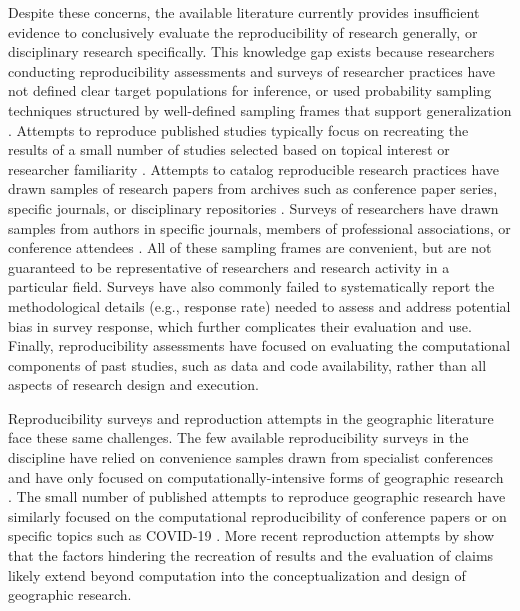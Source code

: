 \documentclass[]{interact}
\newcommand{\citep}{\parencite}
\theoremstyle{plain}%
\theoremstyle{definition}
\theoremstyle{remark}
\begin{document}
Despite these concerns, the available literature currently provides insufficient evidence to conclusively evaluate the reproducibility of research generally, or disciplinary research specifically.
This knowledge gap exists because researchers conducting reproducibility assessments and surveys of researcher practices have not defined clear target populations for inference, or used probability sampling techniques structured by well-defined sampling frames that support generalization \citep{NASEM2019}.
Attempts to reproduce published studies typically focus on recreating the results of a small number of studies selected based on topical interest or researcher familiarity \citep{camerer2016evaluating, camerer2018evaluating, open2015estimating}. 
Attempts to catalog reproducible research practices have drawn samples of research papers from archives such as conference paper series, specific journals, or disciplinary repositories \citep{byrne_2017, gundersen2018state, stodden2016enhancing, stodden2018enabling}.
Surveys of researchers have drawn samples from authors in specific journals, members of professional associations, or conference attendees \citep{baker20161}.
All of these sampling frames are convenient, but are not guaranteed to be representative of researchers and research activity in a particular field. 
Surveys have also commonly failed to systematically report the methodological details (e.g., response rate) needed to assess and address potential bias in survey response, which further complicates their evaluation and use. 
Finally, reproducibility assessments have focused on evaluating the computational components of past studies, such as data and code availability, rather than all aspects of research design and execution.

Reproducibility surveys and reproduction attempts in the geographic literature face these same challenges. 
The few available reproducibility surveys in the discipline have relied on convenience samples drawn from specialist conferences and have only focused on computationally-intensive forms of geographic research \citep{balz2020reproducibility, konkol2019, ostermann2017}. 
The small number of published attempts to reproduce geographic research have similarly focused on the computational reproducibility of conference papers \citep{Nust-AGILE_2018, Nust_AGILE_2020, Nust_AGILE_2021, Nust_AGILE_2022, ostermann2021} or on specific topics such as COVID-19 \citep{Holler2023disability, Kedron2022dimaggio, Kedron2023Beyond, paez2022reproducibility}. 
More recent reproduction attempts by \textcite{Kedron2023Beyond} show that the factors hindering the recreation of results and the evaluation of claims likely extend beyond computation into the conceptualization and design of geographic research.
\end{document}
